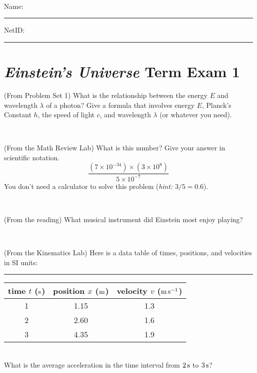 \documentclass[12pt, letterpaper]{article}
\begin{document}
\vfill ~


\cleardoublepage



\noindent
Name: \rule[-1ex]{0.60\textwidth}{0.1pt}
NetID: \rule[-1ex]{0.20\textwidth}{0.1pt}

\section*{\textsl{Einstein's Universe} Term Exam 1}
\setcounter{problem}{1}


\begin{problem} (From Problem Set 1)
What is the relationship between the energy $E$ and wavelength
$\lambda$ of a photon? Give a formula that involves energy $E$,
Planck's Constant $h$, the speed of light $c$, and wavelength
$\lambda$ (or whatever you need).
\end{problem}

\vfill ~

\begin{problem} (From the Math Review Lab)
What is this number? Give your answer in scientific notation.
$$
\frac{(7\times10^{-34})\times(3\times10^8)}{5\times10^{-7}}
$$
You don't need a calculator to solve this problem (\textit{hint: $3/5=0.6$}).
\end{problem}


\vfill ~

\begin{problem} (From the reading)
What musical instrument did Einstein most enjoy playing?
\end{problem}


\vfill ~

\begin{problem} (From the Kinematics Lab)
Here is a data table of times, positions, and velocities in SI units:\\
\rule{1.0in}{0pt}\begin{tabular}{c|c|c}
time $t$ ($\mathrm{s}$) & position $x$ ($\mathrm{m}$) & velocity $v$ ($\mathrm{m}\,\mathrm{s}^{-1}$) \\
\hline
1 & 1.15 & 1.3 \\
2 & 2.60 & 1.6 \\
3 & 4.35 & 1.9 \\
\hline
\end{tabular}\\
What is the average acceleration in the time interval from $2\,\mathrm{s}$ to $3\,\mathrm{s}$?
\end{problem}


\vfill ~
\end{document}
